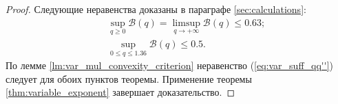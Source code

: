 \begin{proof}
Следующие неравенства доказаны в параграфе \ref{sec:calculations}:
\begin{eqnarray}
\label{eq:var_suf_B_bound}
&& \sup\limits_{q \ge 0}{\mathcal B}(q) = \limsup\limits_{q \to +\infty}{\mathcal B}(q) \le 0.63; \\
\label{eq:var_suf_B_half_bound}
&& \sup\limits_{0 \le q \le 1.36}{\mathcal B}(q) \le 0.5.
\end{eqnarray}
По лемме \ref{lm:var_mul_convexity_criterion} неравенство (\ref{eq:var_suff_qq''}) следует для обоих пунктов теоремы.
Применение теоремы \ref{thm:variable_exponent} завершает доказательство.
\end{proof}
